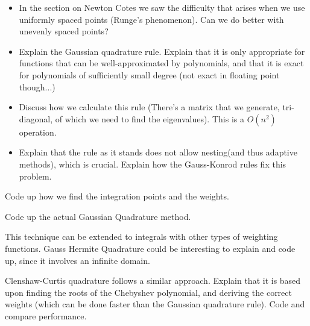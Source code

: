 
\label{Lab:GaussQuad}
\begin{itemize}
\item In the section on Newton Cotes we saw the difficulty that arises when we use uniformly spaced points (Runge's phenomenon). Can we do better with unevenly spaced points?
\item Explain the Gaussian quadrature rule. Explain that it is only appropriate for functions that can be well-approximated by polynomials, and that it is exact for polynomials of sufficiently small degree (not exact in floating point though...)
\item Discuss how we calculate this rule (There's a matrix that we generate, tri-diagonal, of which we need to find the eigenvalues). This is a $O(n^2)$ operation.
\item Explain that the rule as it stands does not allow nesting(and thus adaptive methods), which is crucial. Explain how the Gauss-Konrod rules fix this problem.
\end{itemize}

\begin{problem}
Code up how we find the integration points and the weights.
\end{problem}

\begin{problem}
Code up the actual Gaussian Quadrature method.
\end{problem}

\begin{problem}
This technique can be extended to integrals with other types of weighting functions. Gauss Hermite Quadrature could be interesting to explain and code up, since it involves an infinite domain.
\end{problem}

\begin{problem}
Clenshaw-Curtis quadrature follows a similar approach. Explain that it is based upon finding the roots of the Chebyshev polynomial, and deriving the correct weights (which can be done faster than the Gaussian quadrature rule). Code and compare performance.
\end{problem}



 
